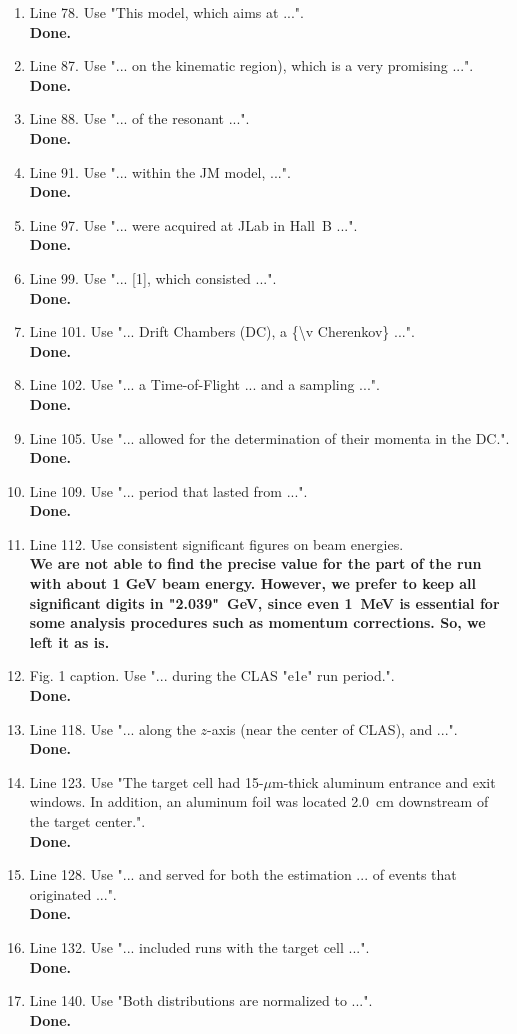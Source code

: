 \documentclass[,superscriptaddress,showpacs,amssymb,amsmath,amsfonts,linenumbers,article]{revtex4-1}
\begin{document}
\begin{itemize}
\begin{enumerate} 
\item Line 78. Use "This model, which aims at ...". \\
{\bf Done.}
\item Line 87. Use "... on the kinematic region), which is a very promising ...". \\
{\bf Done.}
\item Line 88. Use "... of the resonant ...". \\
{\bf Done.}
\item Line 91. Use "... within the JM model, ...". \\
{\bf Done.}
\item Line 97. Use "... were acquired at JLab in Hall~B ...". \\
{\bf Done.}
\item Line 99. Use "... [1], which consisted ...". \\
{\bf Done.}
\item Line 101. Use "... Drift Chambers (DC), a \{\textbackslash v C\textbar herenkov\} ...". \\
{\bf Done.}
\item Line 102. Use "... a Time-of-Flight ... and a sampling ...". \\
{\bf Done.}
\item Line 105. Use "... allowed for the determination of their momenta  in the DC.". \\
{\bf Done.}
\item Line 109. Use "... period that lasted from ...". \\
{\bf Done.}
\item Line 112. Use consistent significant figures on beam energies.\\
{\bf We are not able to find the precise value for the part of the run with about 1 GeV beam energy. However, we prefer to keep all significant digits in "2.039"~GeV, since even 1~MeV is essential for some analysis procedures such as momentum corrections. So, we left it as is.}
\item Fig. 1 caption. Use "... during the CLAS "e1e" run period.". \\
{\bf Done.}
\item Line 118. Use "... along the $z$-axis (near the center of CLAS), and ...". \\
{\bf Done.}
\item Line 123. Use "The target cell had 15-$\mu$m-thick aluminum entrance and exit windows. In addition, an aluminum foil was located 2.0~cm downstream of the target center.". \\
{\bf Done.}
\item Line 128. Use "... and served for both the estimation ... of events that originated ...". \\
{\bf Done.}
\item Line 132. Use "... included runs with the target cell ...". \\
{\bf Done.}
\item Line 140. Use "Both distributions are normalized to ...". \\
{\bf Done.}
\end{enumerate}


\end{itemize}
\end{document}
